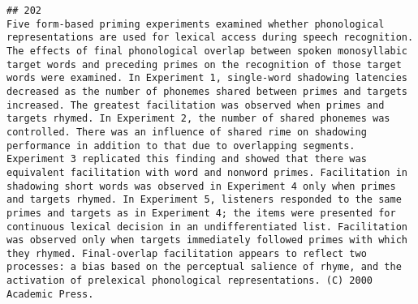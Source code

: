 \documentclass[
  english,
  man]{apa6}
\begin{document}
\begin{verbatim}
## 202                                                                                                                                                                                                                                                                                                                                                                                                                                                                                                                                                                                                                                                                                                                                                                                                                                                                                                                                                                                                                                                                                                                                                                                                                                                       Five form-based priming experiments examined whether phonological representations are used for lexical access during speech recognition. The effects of final phonological overlap between spoken monosyllabic target words and preceding primes on the recognition of those target words were examined. In Experiment 1, single-word shadowing latencies decreased as the number of phonemes shared between primes and targets increased. The greatest facilitation was observed when primes and targets rhymed. In Experiment 2, the number of shared phonemes was controlled. There was an influence of shared rime on shadowing performance in addition to that due to overlapping segments. Experiment 3 replicated this finding and showed that there was equivalent facilitation with word and nonword primes. Facilitation in shadowing short words was observed in Experiment 4 only when primes and targets rhymed. In Experiment 5, listeners responded to the same primes and targets as in Experiment 4; the items were presented for continuous lexical decision in an undifferentiated list. Facilitation was observed only when targets immediately followed primes with which they rhymed. Final-overlap facilitation appears to reflect two processes: a bias based on the perceptual salience of rhyme, and the activation of prelexical phonological representations. (C) 2000 Academic Press.

\end{verbatim}
\end{document}
